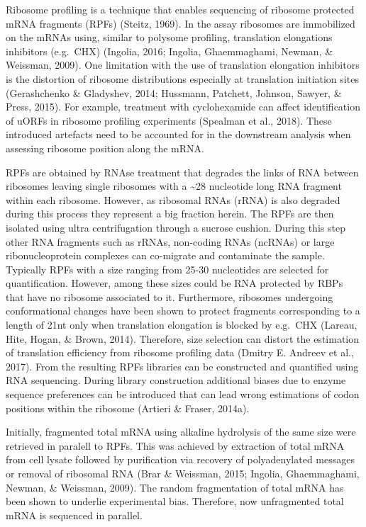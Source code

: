 \documentclass[
  12pt,
  openany]{book}
\begin{document}
Ribosome profiling is a technique that enables sequencing of ribosome protected mRNA fragments (RPFs) (Steitz, 1969). In the assay ribosomes are immobilized on the mRNAs using, similar to polysome profiling, translation elongations inhibitors (e.g.~CHX) (Ingolia, 2016; Ingolia, Ghaemmaghami, Newman, \& Weissman, 2009). One limitation with the use of translation elongation inhibitors is the distortion of ribosome distributions especially at translation initiation sites (Gerashchenko \& Gladyshev, 2014; Hussmann, Patchett, Johnson, Sawyer, \& Press, 2015). For example, treatment with cyclohexamide can affect identification of uORFs in ribosome profiling experiments (Spealman et al., 2018). These introduced artefacts need to be accounted for in the downstream analysis when assessing ribosome position along the mRNA.

RPFs are obtained by RNAse treatment that degrades the links of RNA between ribosomes leaving single ribosomes with a \textasciitilde28 nucleotide long RNA fragment within each ribosome. However, as ribosomal RNAs (rRNA) is also degraded during this process they represent a big fraction herein. The RPFs are then isolated using ultra centrifugation through a sucrose cushion. During this step other RNA fragments such as rRNAs, non-coding RNAs (ncRNAs) or large ribonucleoprotein complexes can co-migrate and contaminate the sample. Typically RPFs with a size ranging from 25-30 nucleotides are selected for quantification. However, among these sizes could be RNA protected by RBPs that have no ribosome associated to it. Furthermore, ribosomes undergoing conformational changes have been shown to protect fragments corresponding to a length of 21nt only when translation elongation is blocked by e.g.~CHX (Lareau, Hite, Hogan, \& Brown, 2014). Therefore, size selection can distort the estimation of translation efficiency from ribosome profiling data (Dmitry E. Andreev et al., 2017). From the resulting RPFs libraries can be constructed and quantified using RNA sequencing. During library construction additional biases due to enzyme sequence preferences can be introduced that can lead wrong estimations of codon positions within the ribosome (Artieri \& Fraser, 2014a).

Initially, fragmented total mRNA using alkaline hydrolysis of the same size were retrieved in paralell to RPFs. This was achieved by extraction of total mRNA from cell lysate followed by purification via recovery of polyadenylated messages or removal of ribosomal RNA (Brar \& Weissman, 2015; Ingolia, Ghaemmaghami, Newman, \& Weissman, 2009). The random fragmentation of total mRNA has been shown to underlie experimental bias. Therefore, now unfragmented total mRNA is sequenced in parallel.
\end{document}
